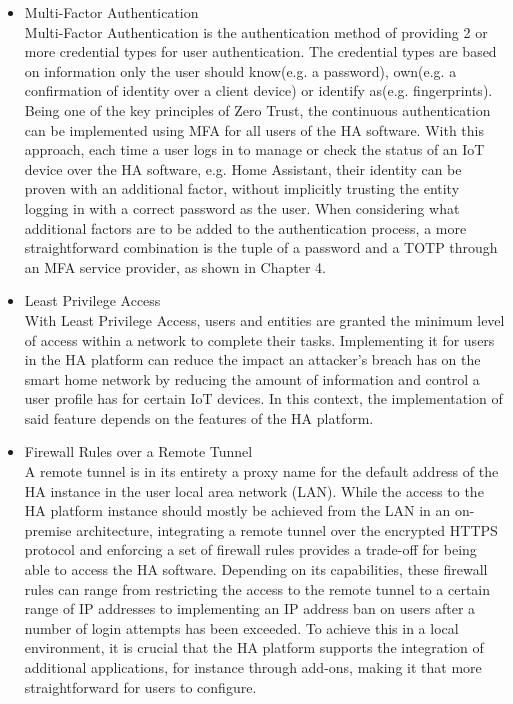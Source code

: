 \begin{itemize}
\item Multi-Factor Authentication\\
  Multi-Factor Authentication is the authentication method of providing 2 or more credential types for user authentication. The credential types are based on information only the user should know(e.g. a password), own(e.g. a confirmation of identity over a client device) or identify as(e.g. fingerprints). Being one of the key principles of Zero Trust, the continuous authentication can be implemented using MFA for all users of the HA software. With this approach, each time a user logs in to manage or check the status of an IoT device over the HA software, e.g. Home Assistant, their identity can be proven with an additional factor, without implicitly trusting the entity logging in with a correct password as the user. When considering what additional factors are to be added to the authentication process, a more straightforward combination is the tuple of a password and a TOTP through an MFA service provider, as shown in Chapter 4.
  
\item Least Privilege Access\\
  With Least Privilege Access, users and entities are granted the minimum level of access within a network to complete their tasks. Implementing it for users in the HA platform can reduce the impact an attacker's breach has on the smart home network by reducing the amount of information and control a user profile has for certain IoT devices. In this context, the implementation of said feature depends on the features of the HA platform.
  
\item Firewall Rules over a Remote Tunnel\\
  A remote tunnel is in its entirety a proxy name for the default address of the HA instance in the user local area network (LAN). While the access to the HA platform instance should mostly be achieved from the LAN in an on-premise architecture, integrating a remote tunnel over the encrypted HTTPS protocol and enforcing a set of firewall rules provides a trade-off for being able to access the HA software. Depending on its capabilities, these firewall rules can range from restricting the access to the remote tunnel to a certain range of IP addresses to implementing an IP address ban on users after a number of login attempts has been exceeded. To achieve this in a local environment, it is crucial that the HA platform supports the integration of additional applications, for instance through add-ons, making it that more straightforward for users to configure.
  

\end{itemize}
